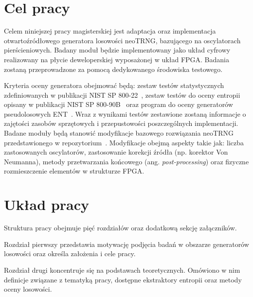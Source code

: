 \section{Cel pracy}

\noindent Celem niniejszej pracy magisterskiej jest adaptacja oraz 
implementacja otwartoźródłowego generatora losowości neoTRNG, bazującego na 
oscylatorach pierścieniowych. Badany moduł będzie implementowany jako układ 
cyfrowy realizowany na płycie deweloperskiej wyposażonej w układ FPGA. Badania 
zostaną przeprowadzone za pomocą dedykowanego środowiska testowego. 

Kryteria oceny generatora obejmować będą: zestaw testów statystycznych 
zdefiniowanych w publikacji NIST SP 800-22~\cite{NIST-SP-800-22}, 
zestaw testów do oceny entropii opisany w publikacji 
NIST SP 800-90B~\cite{NIST-SP-800-90B} oraz program do oceny 
generatorów pseudolosowych ENT~\cite{fourmilab-ENT}. Wraz z wynikami testów 
zestawione zostaną informacje o zajętości zasobów sprzętowych 
i przepustowości poszczególnych implementacji. Badane moduły będą 
stanowić modyfikacje bazowego rozwiązania neoTRNG przedstawionego 
w repozytorium~\cite{neoTRNG}. Modyfikacje obejmą aspekty takie jak: 
liczba zastosowanych oscylatorów, zastosowanie korekcji źródła 
(np. korektor Von Neumanna), metody przetwarzania końcowego 
(ang. \textit{post-processing}) oraz fizyczne rozmieszczenie elementów w strukturze FPGA.








\section{Układ pracy}

\noindent Struktura pracy obejmuje pięć rozdziałów oraz dodatkową sekcję załączników. 

Rozdział pierwszy przedstawia motywację podjęcia badań w obszarze generatorów 
losowości oraz określa założenia i cele pracy. 

Rozdział drugi koncentruje się na podstawach teoretycznych. Omówiono w nim 
definicje związane z tematyką pracy, dostępne ekstraktory entropii oraz metody 
oceny losowości.

